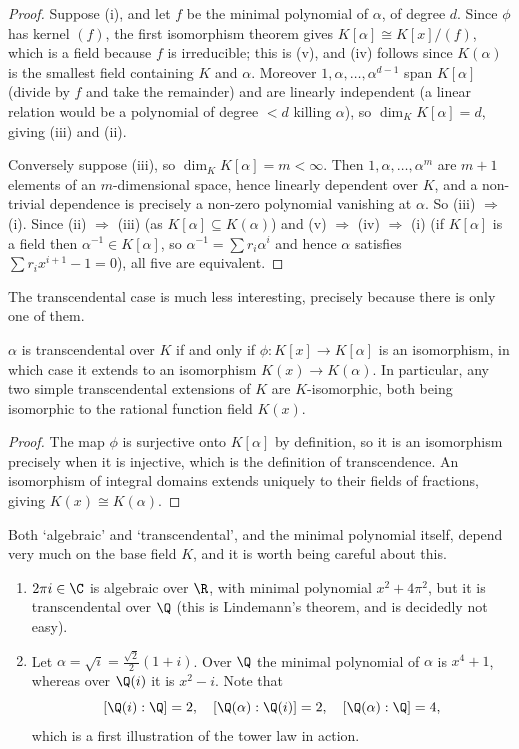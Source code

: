 \begin{proof}
	Suppose (i), and let $f$ be the minimal polynomial of $\alpha$, of degree $d$. Since $\phi$ has kernel $(f)$, the first isomorphism theorem gives $K[\alpha] \cong K[x]/(f)$, which is a field because $f$ is irreducible; this is (v), and (iv) follows since $K(\alpha)$ is the smallest field containing $K$ and $\alpha$. Moreover $1, \alpha, \dots, \alpha^{d-1}$ span $K[\alpha]$ (divide by $f$ and take the remainder) and are linearly independent (a linear relation would be a polynomial of degree $< d$ killing $\alpha$), so $\dim_K K[\alpha] = d$, giving (iii) and (ii).

	Conversely suppose (iii), so $\dim_K K[\alpha] = m < \infty$. Then $1, \alpha, \dots, \alpha^m$ are $m+1$ elements of an $m$-dimensional space, hence linearly dependent over $K$, and a non-trivial dependence is precisely a non-zero polynomial vanishing at $\alpha$. So (iii) $\Rightarrow$ (i). Since (ii) $\Rightarrow$ (iii) (as $K[\alpha] \subseteq K(\alpha)$) and (v) $\Rightarrow$ (iv) $\Rightarrow$ (i) (if $K[\alpha]$ is a field then $\alpha^{-1} \in K[\alpha]$, so $\alpha^{-1} = \sum r_i \alpha^i$ and hence $\alpha$ satisfies $\sum r_i x^{i+1} - 1 = 0$), all five are equivalent.
\end{proof}

The transcendental case is much less interesting, precisely because there is only one of them.

\begin{proposition}
	$\alpha$ is transcendental over $K$ if and only if $\phi : K[x] \to K[\alpha]$ is an isomorphism, in which case it extends to an isomorphism $K(x) \to K(\alpha)$. In particular, any two simple transcendental extensions of $K$ are $K$-isomorphic, both being isomorphic to the rational function field $K(x)$.
\end{proposition}

\begin{proof}
	The map $\phi$ is surjective onto $K[\alpha]$ by definition, so it is an isomorphism precisely when it is injective, which is the definition of transcendence. An isomorphism of integral domains extends uniquely to their fields of fractions, giving $K(x) \cong K(\alpha)$.
\end{proof}

\begin{remark}
	Both `algebraic' and `transcendental', and the minimal polynomial itself, depend very much on the base field $K$, and it is worth being careful about this.
	\begin{enumerate}[label=(\roman*)]
		\item $2\pi i \in \C$ is algebraic over $\R$, with minimal polynomial $x^2 + 4\pi^2$, but it is transcendental over $\Q$ (this is Lindemann's theorem, and is decidedly not easy).
		\item Let $\alpha = \sqrt{i} = \tfrac{\sqrt 2}{2}(1 + i)$. Over $\Q$ the minimal polynomial of $\alpha$ is $x^4 + 1$, whereas over $\Q(i)$ it is $x^2 - i$. Note that
		$$[\Q(i):\Q] = 2, \quad [\Q(\alpha):\Q(i)] = 2, \quad [\Q(\alpha):\Q] = 4,$$
		which is a first illustration of the tower law in action.
	\end{enumerate}
\end{remark}

